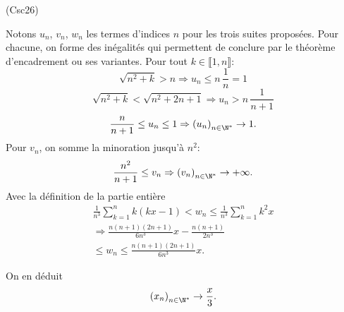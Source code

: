\begin{tiny}(Csc26)\end{tiny} Notons $u_n$, $v_n$, $w_n$ les termes d'indices $n$ pour les trois suites proposées. 
Pour chacune, on forme des inégalités qui permettent de conclure par le théorème d'encadrement ou ses variantes.\newline
Pour tout $k \in \llbracket 1,n \rrbracket$:
\[
 \sqrt{n^2 + k} > n \Rightarrow u_n \leq n\, \frac{1}{n} = 1
\]
\[
 \sqrt{n^2 + k} < \sqrt{n^2 + 2n +1} \Rightarrow u_n > n\, \frac{1}{n+1}
\]
\[
 \frac{n}{n+1} \leq u_n \leq 1 \Rightarrow \left( u_n \right)_{n \in \N^*} \rightarrow 1.
\]
Pour $v_n$, on somme la minoration jusqu'à $n^2$:
\[
 \frac{n^2}{n+1} \leq v_n \Rightarrow \left( v_n \right)_{n \in \N^*} \rightarrow +\infty.
\]
Avec la définition de la partie entière
\begin{multline*}
 \frac{1}{n^3}\sum_{k=1}^nk(kx-1) < w_n \leq \frac{1}{n^3}\sum_{k=1}^nk^2x \\
 \Rightarrow
 \frac{n(n+1)(2n+1)}{6n^3} x  - \frac{n(n+1)}{2n^3} \\
 \leq w_n \leq \frac{n(n+1)(2n+1)}{6n^3} x.
\end{multline*}

On en déduit 
\[
 \left( x_n \right)_{n \in \N^*} \rightarrow \frac{x}{3}.
\]

